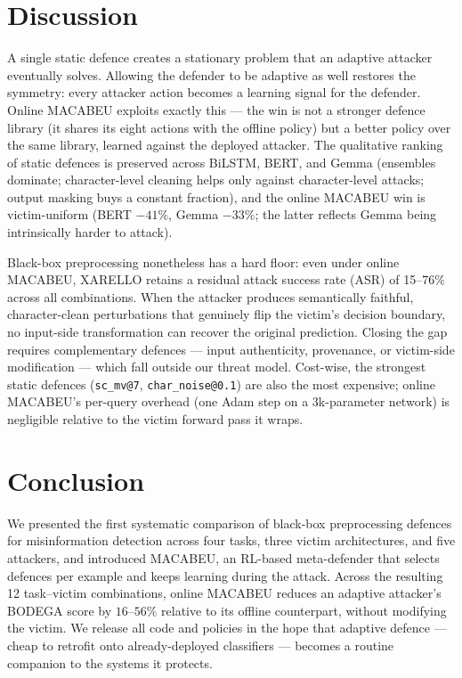 \documentclass[11pt]{article}
\begin{document}
\section{Discussion}

A single static defence creates a stationary problem that an adaptive attacker eventually solves. Allowing the defender to be adaptive as well restores the symmetry: every attacker action becomes a learning signal for the defender. Online MACABEU exploits exactly this --- the win is not a stronger defence library (it shares its eight actions with the offline policy) but a better policy over the same library, learned against the deployed attacker. The qualitative ranking of static defences is preserved across BiLSTM, BERT, and Gemma (ensembles dominate; character-level cleaning helps only against character-level attacks; output masking buys a constant fraction), and the online MACABEU win is victim-uniform (BERT $-41\%$, Gemma $-33\%$; the latter reflects Gemma being intrinsically harder to attack).

Black-box preprocessing nonetheless has a hard floor: even under online MACABEU, XARELLO retains a residual attack success rate (ASR) of 15--76\% across all combinations. When the attacker produces semantically faithful, character-clean perturbations that genuinely flip the victim's decision boundary, no input-side transformation can recover the original prediction. Closing the gap requires complementary defences --- input authenticity, provenance, or victim-side modification --- which fall outside our threat model. Cost-wise, the strongest static defences (\texttt{sc\_mv@7}, \texttt{char\_noise@0.1}) are also the most expensive; online MACABEU's per-query overhead (one Adam step on a 3k-parameter network) is negligible relative to the victim forward pass it wraps.

\section{Conclusion}
We presented the first systematic comparison of black-box preprocessing defences for misinformation detection across four tasks, three victim architectures, and five attackers, and introduced MACABEU, an RL-based meta-defender that selects defences per example and keeps learning during the attack. Across the resulting 12 task--victim combinations, online MACABEU reduces an adaptive attacker's BODEGA score by $16$--$56\%$ relative to its offline counterpart, without modifying the victim. We release all code and policies in the hope that adaptive defence --- cheap to retrofit onto already-deployed classifiers --- becomes a routine companion to the systems it protects.
\end{document}
